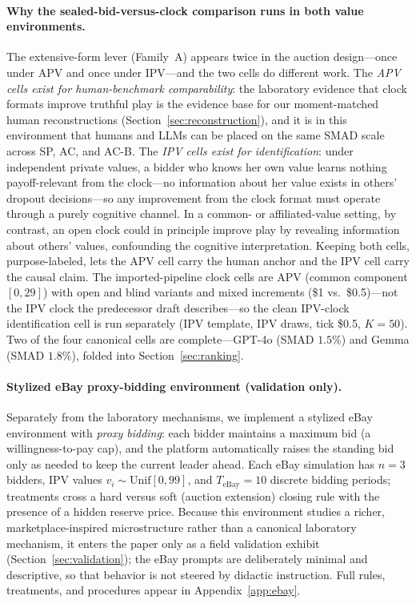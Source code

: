 \paragraph{Why the sealed-bid-versus-clock comparison runs in both value
environments.}
The extensive-form lever (Family~A) appears twice in the auction design---once
under APV and once under IPV---and the two cells do different work. The
\emph{APV cells exist for human-benchmark comparability}: the laboratory
evidence that clock formats improve truthful play
\citep{li2017obviously,breitmoser2022obviousness} is the evidence base for our
moment-matched human reconstructions (Section~\ref{sec:reconstruction}), and it
is in this environment that humans and LLMs can be placed on the same SMAD
scale across SP, AC, and AC-B. The \emph{IPV cells exist for identification}:
under independent private values, a bidder who knows her own value learns
nothing payoff-relevant from the clock---no information about her value exists
in others' dropout decisions---so any improvement from the clock format must
operate through a purely cognitive channel. In a common- or affiliated-value
setting, by contrast, an open clock could in principle improve play by
revealing information about others' values, confounding the cognitive
interpretation. Keeping both cells, purpose-labeled, lets the APV cell carry
the human anchor and the IPV cell carry the causal claim.
The imported-pipeline clock cells are APV (common component $[0,29]$) with open
and blind variants and mixed increments (\$1 vs.\ \$0.5)---not the IPV clock the
predecessor draft describes---so the clean IPV-clock identification cell is run
separately (IPV template, IPV draws, tick \$0.5, $K=50$). Two of the four
canonical cells are complete---GPT-4o (SMAD $1.5\%$) and Gemma (SMAD $1.8\%$),
folded into Section~\ref{sec:ranking}. 

\paragraph{Stylized eBay proxy-bidding environment (validation only).}
Separately from the laboratory mechanisms, we implement a stylized eBay
environment with \emph{proxy bidding}: each bidder maintains a maximum bid (a
willingness-to-pay cap), and the platform automatically raises the standing bid
only as needed to keep the current leader ahead. Each eBay simulation has $n=3$
bidders, IPV values $v_i \sim \mathrm{Unif}[0,99]$, and $T_{\text{eBay}}=10$
discrete bidding periods; treatments cross a hard versus soft (auction
extension) closing rule with the presence of a hidden reserve price. Because
this environment studies a richer, marketplace-inspired microstructure rather
than a canonical laboratory mechanism, it enters the paper only as a field
validation exhibit (Section~\ref{sec:validation}); the eBay prompts are
deliberately minimal and descriptive, so that behavior is not steered by
didactic instruction. Full rules, treatments, and procedures appear in
Appendix~\ref{app:ebay}.

